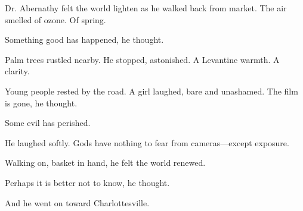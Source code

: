 Dr. Abernathy felt the world lighten as he walked back from market. The air smelled of ozone. Of spring.

Something good has happened, he thought.

Palm trees rustled nearby. He stopped, astonished. A Levantine warmth. A clarity.

Young people rested by the road. A girl laughed, bare and unashamed. The film is gone, he thought.

Some evil has perished.

He laughed softly. Gods have nothing to fear from cameras—except exposure.

Walking on, basket in hand, he felt the world renewed.

Perhaps it is better not to know, he thought.

And he went on toward Charlottesville.
